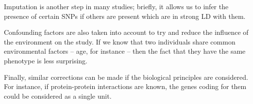 \documentclass[../main.tex]{subfiles}
\begin{document}
Imputation is another step in many studies; briefly, it allows us to 
infer the presence of certain SNPs if others are present which are in 
strong LD with them.

Confounding factors are also taken into account to try and reduce the 
influence of the environment on the study. If we know that two 
individuals share common environmental factors -- age, for instance -- 
then the fact that they have the same phenotype is less surprising.

Finally, similar corrections can be made if the biological principles 
are considered. For instance, if protein-protein interactions are known, 
the genes coding for them could be considered as a single unit. 
\end{document}

